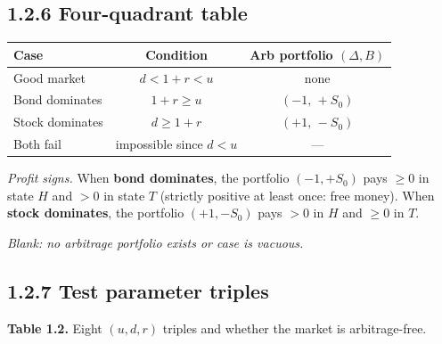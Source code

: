 \documentclass[
  10pt,
  twoside]{book}
\newcounter{none} %
\begin{document}
\subsection{1.2.6 Four-quadrant table}\label{four-quadrant-table}

{\def\LTcaptype{none} %
\begin{table}[H]
\centering
\begin{tabular}{|l|c|c|}
\toprule
Case & Condition & Arb portfolio \((\Delta,B)\) \\
\midrule



Good market & \(d<1+r<u\) & none \\
Bond dominates & \(1+r\ge u\) & \((-1,\,+S_0)\) \\
Stock dominates & \(d \ge 1+r\) & \((+1,\,-S_0)\) \\
Both fail & impossible since \(d<u\) & --- \\
\bottomrule
\end{tabular}
\end{table}
}

\emph{Profit signs.} When \textbf{bond dominates}, the portfolio
\((-1,+S_0)\) pays \(\ge 0\) in state \(H\) and \(>0\) in state \(T\)
(strictly positive at least once: free money). When \textbf{stock
dominates}, the portfolio \((+1,-S_0)\) pays \(>0\) in \(H\) and
\(\ge 0\) in \(T\).

\emph{Blank: no arbitrage portfolio exists or case is vacuous.}

\subsection{1.2.7 Test parameter triples}\label{test-parameter-triples}

\textbf{Table 1.2.} Eight \((u,d,r)\) triples and whether the market is
arbitrage-free.
\end{document}
